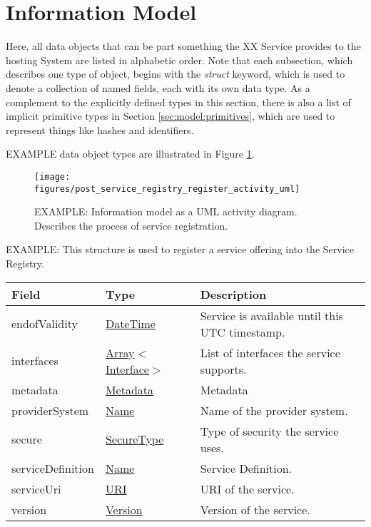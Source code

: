 \documentclass[a4paper]{arrowhead}
\newcommand{\pref}[1]{{\textcolor{ArrowheadGrey}{\hyperref[sec:model:primitives:#1]{#1}}}}
\begin{document}
\section{Information Model}
\label{sec:model}

\color{red} 
Here, all data objects that can be part something the XX Service
provides to the hosting System are listed in alphabetic order.
Note that each subsection, which describes one type of object, begins with the \textit{struct} keyword, which is used to denote a collection of named fields, each with its own data type.
As a complement to the explicitly defined types in this section, there is also a list of implicit primitive types in Section \ref{sec:model:primitives}, which are used to represent things like hashes and identifiers.

EXAMPLE data object types are illustrated in Figure \ref{fig:model_overview}.

\color{black}

\begin{figure}[ht!]
  \centering
  \texttt{[image: figures/post\_service\_registry\_register\_activity\_uml]}
  \caption{\color{red} EXAMPLE:
    Information model as a UML activity diagram.
    Describes the process of service registration.
    \color{black}
  }
  \label{fig:model_overview}
\end{figure}

\newpage


\color{red} 
EXAMPLE: This structure is used to register a service offering into the Service Registry.
\color{black}
 
\begin{table}[ht!]
\begin{tabularx}{\textwidth}{| p{4.25cm} | p{3.5cm} | X |} \hline
\rowcolor{gray!33} Field & Type      & Description \\ \hline
endofValidity                 & \pref{DateTime} & Service is available until this UTC timestamp. \\ \hline
interfaces                   & \pref{Array}$<$\pref{Interface}$>$     & List of interfaces the service supports. \\ \hline
metadata                  & \pref{Metadata}     & Metadata \\ \hline
providerSystem                    & \pref{Name} & Name of the provider system. \\ \hline
secure                   &\pref{SecureType}  & Type of security the service uses. \\ \hline
serviceDefinition         &\pref{Name}        & Service Definition. \\ \hline
serviceUri                &\pref{URI}         & URI of the service. \\ \hline
version                   &\pref{Version}     & Version of the service. \\ \hline
\end{tabularx}
\end{table}
\end{document}
